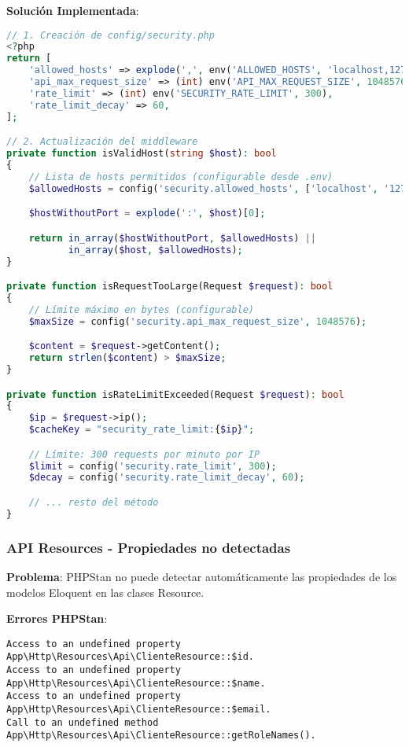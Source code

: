 \documentclass[12pt,a4paper]{article}
\begin{document}
\textbf{Solución Implementada}:
\begin{lstlisting}[language=php, caption=Después - Uso de configuración centralizada]
// 1. Creación de config/security.php
<?php
return [
    'allowed_hosts' => explode(',', env('ALLOWED_HOSTS', 'localhost,127.0.0.1')),
    'api_max_request_size' => (int) env('API_MAX_REQUEST_SIZE', 1048576),
    'rate_limit' => (int) env('SECURITY_RATE_LIMIT', 300),
    'rate_limit_decay' => 60,
];

// 2. Actualización del middleware
private function isValidHost(string $host): bool
{
    // Lista de hosts permitidos (configurable desde .env)
    $allowedHosts = config('security.allowed_hosts', ['localhost', '127.0.0.1']);

    $hostWithoutPort = explode(':', $host)[0];

    return in_array($hostWithoutPort, $allowedHosts) ||
           in_array($host, $allowedHosts);
}

private function isRequestTooLarge(Request $request): bool
{
    // Límite máximo en bytes (configurable)
    $maxSize = config('security.api_max_request_size', 1048576);

    $content = $request->getContent();
    return strlen($content) > $maxSize;
}

private function isRateLimitExceeded(Request $request): bool
{
    $ip = $request->ip();
    $cacheKey = "security_rate_limit:{$ip}";

    // Límite: 300 requests por minuto por IP
    $limit = config('security.rate_limit', 300);
    $decay = config('security.rate_limit_decay', 60);

    // ... resto del método
}
\end{lstlisting}

\subsubsection{API Resources - Propiedades no detectadas}

\textbf{Problema}: PHPStan no puede detectar automáticamente las propiedades de los modelos Eloquent en las clases Resource.

\textbf{Errores PHPStan}:
\begin{lstlisting}[caption=Errores en ClienteResource.php]
Access to an undefined property App\Http\Resources\Api\ClienteResource::$id.
Access to an undefined property App\Http\Resources\Api\ClienteResource::$name.
Access to an undefined property App\Http\Resources\Api\ClienteResource::$email.
Call to an undefined method App\Http\Resources\Api\ClienteResource::getRoleNames().
\end{lstlisting}
\end{document}
